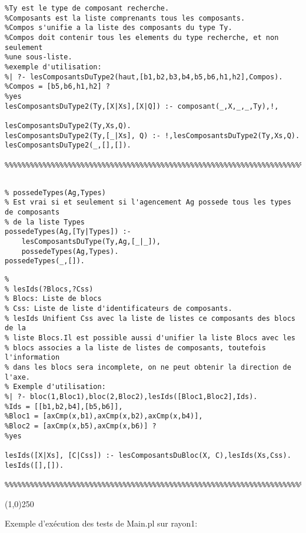 \documentclass[letterpaper,11pt]{letter}
\begin{document}
\begin{Verbatim}[fontseries=b]
%lesComposantsDuType2(Ty,Composants,Compos).
%Ty est le type de composant recherche.
%Composants est la liste comprenants tous les composants.
%Compos s'unifie a la liste des composants du type Ty.
%Compos doit contenir tous les elements du type recherche, et non seulement
%une sous-liste.
%exemple d'utilisation:
%| ?- lesComposantsDuType2(haut,[b1,b2,b3,b4,b5,b6,h1,h2],Compos).
%Compos = [b5,b6,h1,h2] ? 
%yes
lesComposantsDuType2(Ty,[X|Xs],[X|Q]) :- composant(_,X,_,_,Ty),!,
                                         lesComposantsDuType2(Ty,Xs,Q).
lesComposantsDuType2(Ty,[_|Xs], Q) :- !,lesComposantsDuType2(Ty,Xs,Q).
lesComposantsDuType2(_,[],[]).

%%%%%%%%%%%%%%%%%%%%%%%%%%%%%%%%%%%%%%%%%%%%%%%%%%%%%%%%%%%%%%%%%%%%%%%%%%%%%%%%%
\end{Verbatim}
\begin{Verbatim}

% possedeTypes(Ag,Types)
% Est vrai si et seulement si l'agencement Ag possede tous les types de composants
% de la liste Types
possedeTypes(Ag,[Ty|Types]) :-
	lesComposantsDuType(Ty,Ag,[_|_]),
	possedeTypes(Ag,Types).
possedeTypes(_,[]).

\end{Verbatim}
\begin{Verbatim}[fontseries=b]
%%%%%%%%%%%%%%%%%%%%%%%%%%%%%%%%%%%%%%%%%%%%%%%%%%%%%%%%%%%%%%%%%%%%%%%%%%%%%%%
% 
% lesIds(?Blocs,?Css)
% Blocs: Liste de blocs
% Css: Liste de liste d'identificateurs de composants.
% lesIds Unifient Css avec la liste de listes ce composants des blocs de la 
% liste Blocs.Il est possible aussi d'unifier la liste Blocs avec les
% blocs associes a la liste de listes de composants, toutefois l'information
% dans les blocs sera incomplete, on ne peut obtenir la direction de l'axe.
% Exemple d'utilisation:
%| ?- bloc(1,Bloc1),bloc(2,Bloc2),lesIds([Bloc1,Bloc2],Ids).
%Ids = [[b1,b2,b4],[b5,b6]],
%Bloc1 = [axCmp(x,b1),axCmp(x,b2),axCmp(x,b4)],
%Bloc2 = [axCmp(x,b5),axCmp(x,b6)] ? 
%yes 

lesIds([X|Xs], [C|Css]) :- lesComposantsDuBloc(X, C),lesIds(Xs,Css).
lesIds([],[]).

%%%%%%%%%%%%%%%%%%%%%%%%%%%%%%%%%%%%%%%%%%%%%%%%%%%%%%%%%%%%%%%%%%%%%%%%%%%%%%%
\end{Verbatim}

\begin{center}
\line(1,0){250}
\end{center}

Exemple d'exécution des tests de Main.pl sur rayon1:
\end{document}
